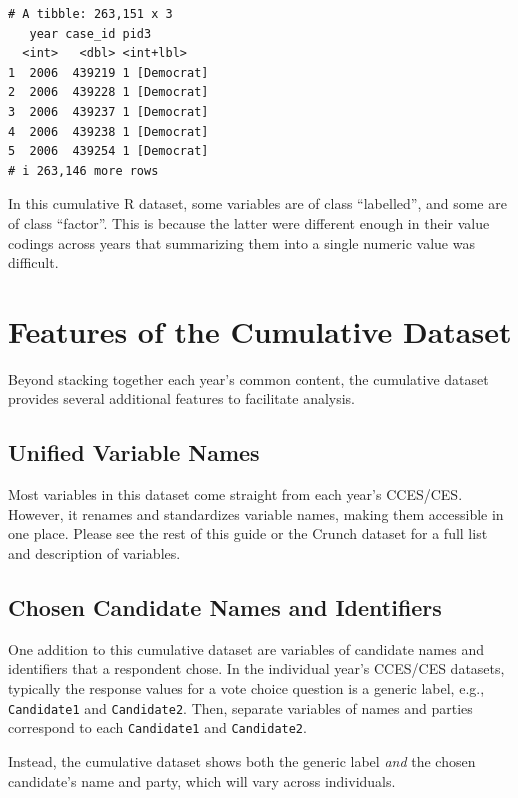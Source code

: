 \documentclass[10pt,article,oneside]{memoir}
\begin{document}
\begin{verbatim}
# A tibble: 263,151 x 3
   year case_id pid3        
  <int>   <dbl> <int+lbl>   
1  2006  439219 1 [Democrat]
2  2006  439228 1 [Democrat]
3  2006  439237 1 [Democrat]
4  2006  439238 1 [Democrat]
5  2006  439254 1 [Democrat]
# i 263,146 more rows
\end{verbatim}

\indent In this cumulative R dataset, some variables are of class
``labelled'', and some are of class ``factor''. This is because the
latter were different enough in their value codings across years that
summarizing them into a single numeric value was difficult.

\newpage

\section{Features of the Cumulative
Dataset}\label{features-of-the-cumulative-dataset}

Beyond stacking together each year's common content, the cumulative
dataset provides several additional features to facilitate analysis.

\subsection{Unified Variable Names}\label{unified-variable-names}

Most variables in this dataset come straight from each year's CCES/CES.
However, it renames and standardizes variable names, making them
accessible in one place. Please see the rest of this guide or the Crunch
dataset for a full list and description of variables.

\subsection{Chosen Candidate Names and
Identifiers}\label{chosen-candidate-names-and-identifiers}

One addition to this cumulative dataset are variables of candidate names
and identifiers that a respondent chose. In the individual year's
CCES/CES datasets, typically the response values for a vote choice
question is a generic label, e.g., \texttt{Candidate1} and
\texttt{Candidate2}. Then, separate variables of names and parties
correspond to each \texttt{Candidate1} and \texttt{Candidate2}.

Instead, the cumulative dataset shows both the generic label \emph{and}
the chosen candidate's name and party, which will vary across
individuals.
\end{document}
